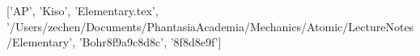 ['AP', 'Kiso', 'Elementary.tex', '/Users/zechen/Documents/PhantasiaAcademia/Mechanics/Atomic/LectureNotes/Elementary', 'Bohr\x8f\xad{}\xae\xba{}\x9a\x9c\xbd\x8d\x8c', '\x8f\x8d\x8e\x9f\xad{}']
